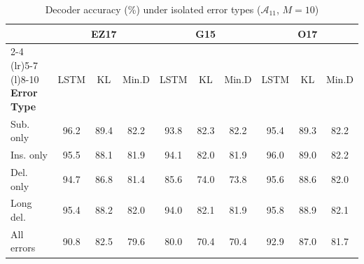 
\begin{table}[h]
\caption{Decoder accuracy (\%) under isolated error types ($\mathcal{A}_{11}$, $M=10$)}
\centering
\renewcommand{\arraystretch}{1.2}
\setlength{\tabcolsep}{3pt}
\begin{tabular}{l|ccc|ccc|ccc}
\toprule
& \multicolumn{3}{c|}{\textbf{EZ17}}
& \multicolumn{3}{c|}{\textbf{G15}}
& \multicolumn{3}{c}{\textbf{O17}} \\
\cmidrule(lr){2-4} \cmidrule(lr){5-7} \cmidrule(l){8-10}
\textbf{Error Type} & LSTM & KL & Min.D & LSTM & KL & Min.D & LSTM & KL & Min.D \\
\midrule
Sub. only & 96.2 & 89.4 & 82.2 & 93.8 & 82.3 & 82.2 & 95.4 & 89.3 & 82.2 \\
Ins. only & 95.5 & 88.1 & 81.9 & 94.1 & 82.0 & 81.9 & 96.0 & 89.0 & 82.2 \\
Del. only & 94.7 & 86.8 & 81.4 & 85.6 & 74.0 & 73.8 & 95.6 & 88.6 & 82.0 \\
Long del. & 95.4 & 88.2 & 82.0 & 94.0 & 82.1 & 81.9 & 95.8 & 88.9 & 82.1 \\
\midrule
All errors & 90.8 & 82.5 & 79.6 & 80.0 & 70.4 & 70.4 & 92.9 & 87.0 & 81.7 \\
\bottomrule
\end{tabular}
\label{Table:ErrorTypeIsolation}
\end{table}
